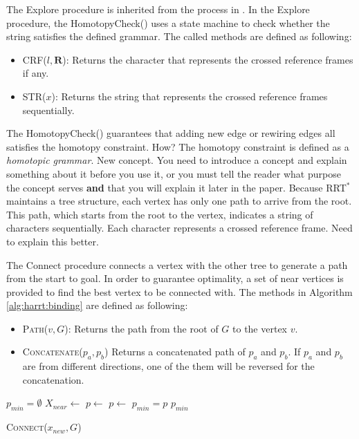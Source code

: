 \documentclass[letterpaper, 10 pt, conference]{ieeeconf}
\begin{document}
The {\sc Explore} procedure is inherited from the process in \cite{Karaman-RSS-10}.
In the {\sc Explore} procedure, the {\sc HomotopyCheck}() uses a state machine to check whether the string satisfies the defined grammar.
The called methods are defined as following:
\begin{itemize}
	\item \textsc{CRF}($ l, \bm{R} $):
	Returns the character that represents the crossed reference frames if any.
	\item \textsc{STR}($ x $):	
	Returns the string that represents the crossed reference frames sequentially.
\end{itemize}

The {\sc HomotopyCheck}() guarantees that adding new edge or rewiring edges all satisfies the homotopy constraint. {\sc How?}
The homotopy constraint is defined as a \emph{homotopic grammar}.
{\sc New concept.  You need to introduce a concept and explain something about it before you use it, or you must tell the reader what purpose the concept serves {\bf and} that you will explain it later in the paper.}
Because RRT$^{*}$ maintains a tree structure, each vertex has only one path to arrive from the root.
This path, which starts from the root to the vertex, indicates a string of characters sequentially.
Each character represents a crossed reference frame. 
{\sc Need to explain  this better.}

The {\sc Connect} procedure connects a vertex with the other tree to generate a path from the start to goal.
In order to guarantee optimality, a set of near vertices is provided to find the best vertex to be connected with.
The methods in Algorithm \ref{alg:harrt:binding} are defined as following:
\begin{itemize}
	\item \textsc{Path}($ v, G $):	
	Returns the path from the root of $ G $ to the vertex $ v $.
	\item \textsc{Concatenate}{($ p_{a}, p_{b} $)}
	Returns a concatenated path of $ p_{a} $ and $  p_{b} $.
	If $ p_{a} $ and $  p_{b} $ are from different directions, one of the them will be reversed for the concatenation.
\end{itemize}

\begin{algorithm}[hbtp]
	\begin{algorithmic}[1]
		\State $ p_{min} = \emptyset $
		\State $ X_{near} \leftarrow $ 
					\State $ p \leftarrow $ 
				\Else
				    \State $ p \leftarrow $ 			
				\EndIf
			    	\State $ p_{min} = p $
			    \EndIf 
			\EndIf
		\EndFor
		\Return $ p_{min} $
	\end{algorithmic}
	\caption{ \textsc{Connect}($ x_{new}, G $) }
	\label{alg:harrt:binding}
\end{algorithm}
\end{document}
